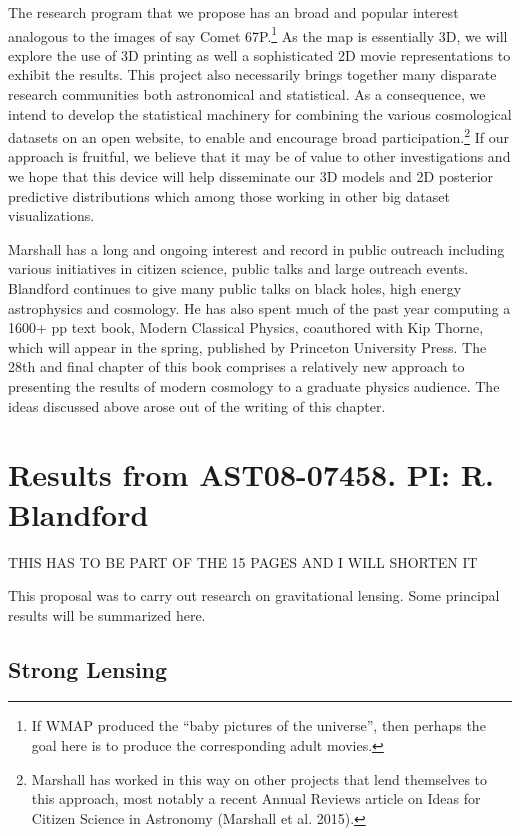 \documentclass[psfig,11pt]{article}
\begin{document}
The research program that we propose has an broad and popular interest analogous to the images of say Comet 67P.\footnote{If WMAP produced the ``baby pictures of the universe'', then perhaps the goal here is to produce the corresponding adult movies.} As the map is essentially 3D, we will explore the use of 3D printing as well a sophisticated 2D movie representations to exhibit the results. This project also necessarily brings together many disparate research communities both astronomical and statistical. As a consequence, we intend to develop the statistical machinery for combining the various cosmological datasets on an open website, to enable and encourage broad participation.\footnote{Marshall has worked in this way on other projects that lend themselves to this approach, most notably a recent Annual Reviews article on Ideas for Citizen Science in Astronomy (Marshall et al. 2015).} If our approach is fruitful, we believe that it may be of value to other investigations and we hope that this device will help disseminate our 3D models and 2D posterior predictive distributions which among those working in other big dataset visualizations.

Marshall has a long and ongoing interest and record in public outreach including various initiatives in citizen science, public talks and large outreach events.  Blandford continues to give many public talks on black holes, high energy astrophysics and cosmology. He has also spent much of the past year computing a 1600+ pp text book, Modern Classical Physics, coauthored with Kip Thorne, which will appear in the spring, published by Princeton University Press. The 28th and final chapter of this book comprises a relatively new approach to presenting the results of modern cosmology to a graduate physics audience. The ideas discussed above arose out of the writing of this chapter.



\section{Results from AST08-07458. PI: R. Blandford}

THIS HAS TO BE PART OF THE 15 PAGES AND I WILL SHORTEN IT

This proposal was to carry out research on gravitational lensing. Some principal results will be summarized here.
\subsection{Strong Lensing}
\end{document}
